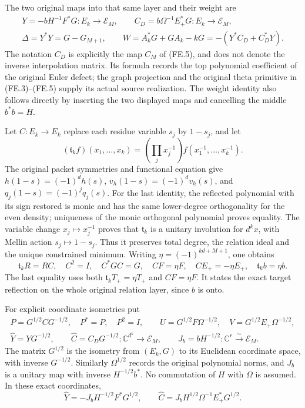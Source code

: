 The two original maps into that same layer and their weight are
\[
 \begin{gathered}
 Y=-bH^{-1}F^*G:E_k\to\mathcal E_M,\qquad
 C_D=b\Omega^{-1}E_+^*G:E_k\to\mathcal E_M,\\
 \Delta=Y^*Y=G-G_{M+1},\qquad
 W=A_k^*G+GA_k-kG=-(Y^*C_D+C_D^*Y).
 \end{gathered}                                                     \tag{QD.2}
\]
The notation \(C_D\) is explicitly the map \(C_M\) of (FE.5),
and does not denote the inverse interpolation matrix.  Its
formula records the top polynomial coefficient of the original
Euler defect; the graph projection and the original theta
primitive in (FE.3)--(FE.5) supply its actual source realization.
The weight identity also follows directly by inserting the two
displayed maps and cancelling the middle \(b^*b=H\).

Let \(C:E_k\to E_k\) replace each residue variable \(s_j\)
by \(1-s_j\), and let
\[
 (\mathfrak t_kf)(x_1,\ldots,x_k)
   =\left(\prod_jx_j^{-1}\right)
                           f(x_1^{-1},\ldots,x_k^{-1}).
\]
The original packet symmetries and functional equation give
\(h(1-s)=(-1)^dh(s)\),
\(v_h(1-s)=(-1)^dv_h(s)\), and
\(q_j(1-s)=(-1)^jq_j(s)\).  For the last identity, the
reflected polynomial with its sign restored is monic and has
the same lower-degree orthogonality for the even density;
uniqueness of the monic orthogonal polynomial proves equality.
The variable change \(x_j\mapsto x_j^{-1}\) proves that
\(\mathfrak t_k\) is a unitary involution for \(d^kx\), with
Mellin action \(s_j\mapsto1-s_j\).  Thus it preserves total
degree, the relation ideal and the unique constrained minimum.
Writing \(\eta=(-1)^{kd+M+1}\), one obtains
\[
 \mathfrak t_kR=RC,\quad C^2=I,\quad C^*GC=G,\quad
 CF=\eta F,\quad CE_+=-\eta E_+,\quad
 \mathfrak t_kb=\eta b.                                      \tag{QD.3}
\]
The last equality uses both
\(\mathfrak t_kT_+=\eta T_+\) and \(CF=\eta F\).
It states the exact target reflection on the whole original
relation layer, since \(b\) is onto.

For explicit coordinate isometries put
\[
 \begin{gathered}
 P=G^{1/2}CG^{-1/2},\quad P^*=P,\quad P^2=I,\qquad
 U=G^{1/2}F\Omega^{-1/2},\quad
 V=G^{1/2}E_+\Omega^{-1/2},\\
 \widehat Y=YG^{-1/2},\qquad
 \widehat C=C_DG^{-1/2}:\mathbb C^{d^k}\to\mathcal E_M,\qquad
 J_b=bH^{-1/2}:\mathbb C^r\xrightarrow{\sim}\mathcal E_M.
 \end{gathered}                                                   \tag{QD.4}
\]
The matrix \(G^{1/2}\) is the isometry from \((E_k,G)\)
to its Euclidean coordinate space, with inverse \(G^{-1/2}\).
Similarly \(\Omega^{1/2}\) records the original polynomial
norms, and \(J_b\) is a unitary map with inverse
\(H^{-1/2}b^*\).  No commutation of \(H\) with \(\Omega\)
is assumed.  In these exact coordinates,
\[
 \widehat Y=-J_bH^{-1/2}F^*G^{1/2},\qquad
 \widehat C=J_bH^{1/2}\Omega^{-1}E_+^*G^{1/2}.
                                                                    \tag{QD.5}
\]

